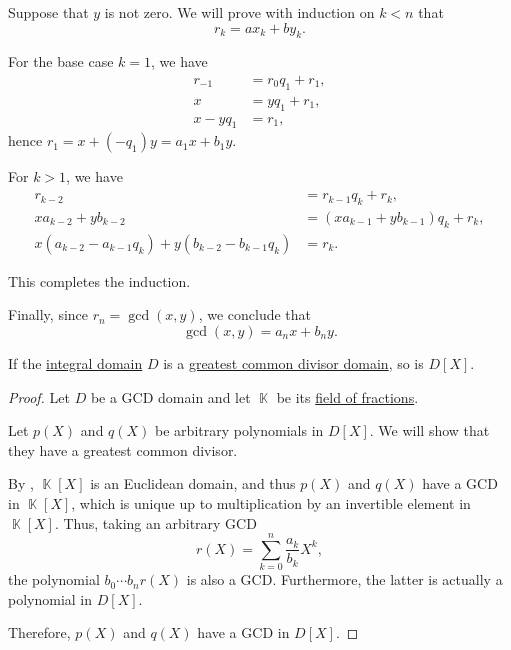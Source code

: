 \begin{defproof}
  Suppose that \( y \) is not zero. We will prove with induction on \( k < n \) that
  \begin{equation*}
    r_k = a x_k + b y_k.
  \end{equation*}

  For the base case \( k = 1 \), we have
  \begin{align*}
    r_{-1}    &= r_0 q_1 + r_1, \\
    x         &= y q_1 + r_1,   \\
    x - y q_1 &= r_1,
  \end{align*}
  hence \( r_1 = x + (-q_1) y = a_1 x + b_1 y \).

  For \( k > 1 \), we have
  \begin{align*}
    r_{k-2}                                               &= r_{k-1} q_k + r_k,                 \\
    x a_{k-2} + y b_{k-2}                                 &= (x a_{k-1} + y b_{k-1}) q_k + r_k, \\
    x (a_{k-2} - a_{k-1} q_k) + y (b_{k-2} - b_{k-1} q_k) &= r_k.
  \end{align*}

  This completes the induction.

  Finally, since \( r_n = \gcd(x, y) \), we conclude that
  \begin{equation*}
    \gcd(x, y) = a_n x + b_n y.
  \end{equation*}
\end{defproof}

\begin{proposition}\label{thm:polynomial_ring_over_gcd_domain}
  If the \hyperref[def:integral_domain]{integral domain} \( D \) is a \hyperref[def:gcd_domain]{greatest common divisor domain}, so is \( D[X] \).
\end{proposition}
\begin{proof}
  Let \( D \) be a GCD domain and let \( \BbbK \) be its \hyperref[thm:field_of_fractions]{field of fractions}.

  Let \( p(X) \) and \( q(X) \) be arbitrary polynomials in \( D[X] \). We will show that they have a greatest common divisor.

  By , \( \BbbK[X] \) is an Euclidean domain, and thus \( p(X) \) and \( q(X) \) have a GCD in \( \BbbK[X] \), which is unique up to multiplication by an invertible element in \( \BbbK[X] \). Thus, taking an arbitrary GCD
  \begin{equation*}
    r(X) = \sum_{k=0}^n \frac {a_k} {b_k} X^k,
  \end{equation*}
  the polynomial \( b_0 \cdots b_n r(X) \) is also a GCD. Furthermore, the latter is actually a polynomial in \( D[X] \).

  Therefore, \( p(X) \) and \( q(X) \) have a GCD in \( D[X] \).
\end{proof}


